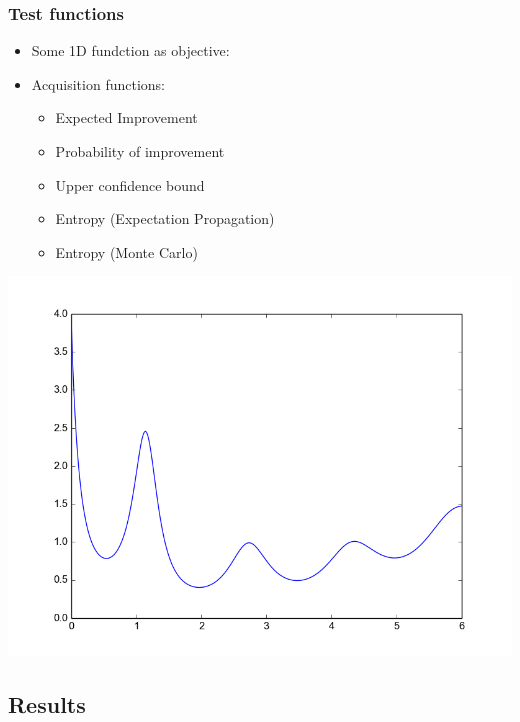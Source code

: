 \documentclass[10pt,handout]{beamer}
\begin{document}
\begin{frame}
\frametitle{Test functions}
\begin{minipage}{0.55\textwidth}
\begin{itemize}
\item Some 1D fundction as objective:
\item Acquisition functions:
\begin{itemize}
\item Expected Improvement
\item Probability of improvement
\item Upper confidence bound
\item Entropy (Expectation Propagation)
\item Entropy (Monte Carlo)
\end{itemize}
\end{itemize}  
\end{minipage}%
\begin{minipage}{0.43\textwidth}
\includegraphics[width=\textwidth]{self_constructed_oned.png}
\end{minipage}
\end{frame}


\subsection{Results}
\end{document}
